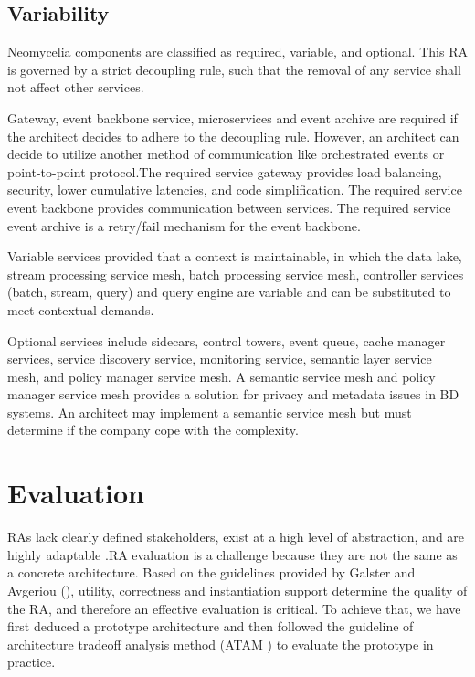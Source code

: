 \documentclass[conference]{IEEEtran}
\begin{document}
\subsection{Variability}
Neomycelia components are classified as required, variable, and optional. This RA is governed by a strict decoupling rule, such that the removal of any service shall not affect other services.

Gateway, event backbone service, microservices and event archive are required if the architect decides to adhere to the decoupling rule. However, an architect can decide to utilize another method of communication like orchestrated events or point-to-point protocol.The required service gateway provides load balancing, security, lower cumulative latencies, and code simplification. The required service event backbone provides communication between services. The required service event archive is a retry/fail mechanism for the event backbone.

Variable services provided that  a context is maintainable, in which the data lake, stream processing service mesh, batch processing service mesh, controller services (batch, stream, query) and query engine are variable and can be substituted to meet contextual demands.

Optional services include sidecars, control towers, event queue, cache manager services, service discovery service, monitoring service, semantic layer service mesh, and policy manager service mesh. A semantic service mesh and policy manager service mesh provides a solution for privacy and metadata issues in BD systems. An architect may implement a semantic service mesh but must determine if the company cope with the complexity.

\section{Evaluation}

RAs lack clearly defined stakeholders, exist at a high level of abstraction, and are highly adaptable \cite{AtaeiACIS}.RA evaluation is a challenge \cite{angelov2008contracting,Avgeriou} because they are not the same as a concrete architecture. Based on the guidelines provided by Galster and Avgeriou (\cite{GALSTER}), utility, correctness and instantiation support determine the quality of the RA, and therefore an effective evaluation is critical. To achieve that, we have first deduced a prototype architecture and then followed the guideline of architecture tradeoff analysis method (ATAM \cite{KazmanATAM}) to evaluate the prototype in practice.
\end{document}
